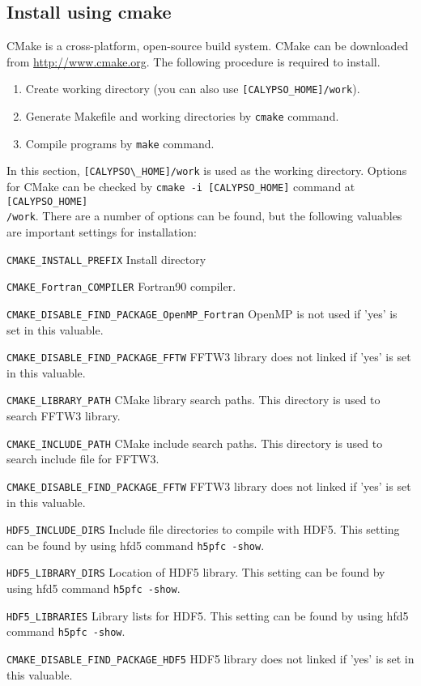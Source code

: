 \subsection{Install using cmake}
CMake is a cross-platform, open-source build system. CMake can be downloaded from \url{http://www.cmake.org}. The following procedure is required to install.
%
\begin{enumerate}
\item Create working directory (you can also use \verb|[CALYPSO_HOME]/work|).
\item Generate Makefile and working directories by {\tt cmake} command.
\item Compile programs by {\tt make} command.
\end{enumerate}
%
In this section, \verb|[CALYPSO\_HOME]/work| is used as the working directory.
Options for CMake can be checked by \verb|cmake -i [CALYPSO_HOME]| command at \verb|[CALYPSO_HOME]| \\
\verb|/work|. There are a number of options can be found, but the following valuables are important settings for installation:
%
\begin{description}
\item{\verb|CMAKE_INSTALL_PREFIX|}  Install directory
\item{\verb|CMAKE_Fortran_COMPILER|} Fortran90 compiler.
\item{\verb|CMAKE_DISABLE_FIND_PACKAGE_OpenMP_Fortran|} OpenMP is not used if 'yes' is set in this valuable.

\item{\verb|CMAKE_DISABLE_FIND_PACKAGE_FFTW|}  FFTW3 library does not linked if 'yes' is set in this valuable.

\item{\verb|CMAKE_LIBRARY_PATH|}   CMake library  search paths. This directory is used to search FFTW3 library.
\item{\verb|CMAKE_INCLUDE_PATH|}   CMake include search paths. This directory is used to search include file for FFTW3.

\item{\verb|CMAKE_DISABLE_FIND_PACKAGE_FFTW|}  FFTW3 library does not linked if 'yes' is set in this valuable.

\item{\verb|HDF5_INCLUDE_DIRS|}  Include file directories to compile with HDF5. This setting can be found by using hfd5 command \verb|h5pfc -show|.
\item{\verb|HDF5_LIBRARY_DIRS|}    Location of HDF5 library. This setting can be found by using hfd5 command \verb|h5pfc -show|.
\item{\verb|HDF5_LIBRARIES|}   Library lists for HDF5. This setting can be found by using hfd5 command \verb|h5pfc -show|.
\item{\verb|CMAKE_DISABLE_FIND_PACKAGE_HDF5|}  HDF5 library does not linked if 'yes' is set in this valuable.
\end{description}
